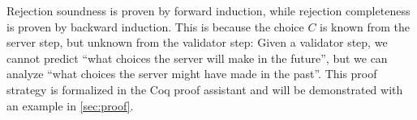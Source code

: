 Rejection soundness is proven by forward induction, while rejection completeness
is proven by backward induction.  This is because the choice $C$ is known from
the server step, but unknown from the validator step: Given a validator step, we
cannot predict ``what choices the server will make in the future'', but we can
analyze ``what choices the server might have made in the past''.  This proof
strategy is formalized in the Coq proof assistant and will be demonstrated with
an example in \autoref{sec:proof}.
